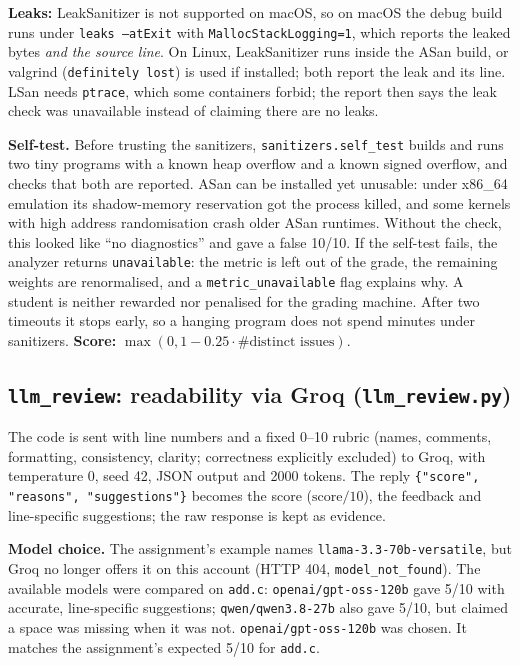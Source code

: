 \documentclass[11pt,a4paper]{article}
\newcommand{\fn}[1]{\nolinkurl{#1}}
\begin{document}
\textbf{Leaks:} LeakSanitizer is not supported on macOS, so on macOS the debug build runs under
\texttt{leaks --atExit} with \texttt{MallocStackLogging=1}, which reports the leaked bytes \emph{and the source line}.
On Linux, LeakSanitizer runs inside the ASan build, or valgrind (\texttt{definitely lost}) is used if installed;
both report the leak and its line. LSan needs \texttt{ptrace}, which some containers forbid; the report then says the leak
check was unavailable instead of claiming there are no leaks.

\textbf{Self-test.} Before trusting the sanitizers, \fn{sanitizers.self_test} builds and runs two tiny programs with a
known heap overflow and a known signed overflow, and checks that both are reported. ASan can be installed yet unusable:
under x86\_64 emulation its shadow-memory reservation got the process killed, and some kernels with high address
randomisation crash older ASan runtimes. Without the check, this looked like ``no diagnostics'' and gave a false 10/10.
If the self-test fails, the analyzer returns \fn{unavailable}: the metric is left out of the grade, the remaining weights
are renormalised, and a \texttt{metric\_unavailable} flag explains why. A student is neither rewarded nor penalised for
the grading machine. After two timeouts it stops early, so a
hanging program does not spend minutes under sanitizers.
\textbf{Score:} $\max(0, 1 - 0.25 \cdot \#\text{distinct issues})$.

\subsection{\texttt{llm\_review}: readability via Groq (\texttt{llm\_review.py})}
The code is sent with line numbers and a fixed 0--10 rubric (names, comments, formatting, consistency,
clarity; correctness explicitly excluded) to Groq, with temperature 0, seed 42, JSON output and
2000 tokens. The reply \texttt{\{"score", "reasons", "suggestions"\}} becomes the score
($\text{score}/10$), the feedback and line-specific suggestions; the raw response is kept as evidence.

\textbf{Model choice.} The assignment's example names \texttt{llama-3.3-70b-versatile}, but Groq no longer offers it
on this account (HTTP 404, \texttt{model\_not\_found}). The available models were compared on \texttt{add.c}:
\texttt{openai/gpt-oss-120b} gave 5/10 with accurate, line-specific suggestions; \texttt{qwen/qwen3.8-27b} also gave 5/10,
but claimed a space was missing when it was not. \texttt{openai/gpt-oss-120b} was chosen. It matches the
assignment's expected 5/10 for \texttt{add.c}.
\end{document}
